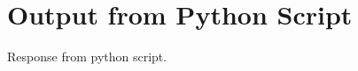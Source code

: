 \documentclass[12pt, a4paper]{article}
\begin{document}
\section*{Output from Python Script}

Response from python script.
\end{document}

